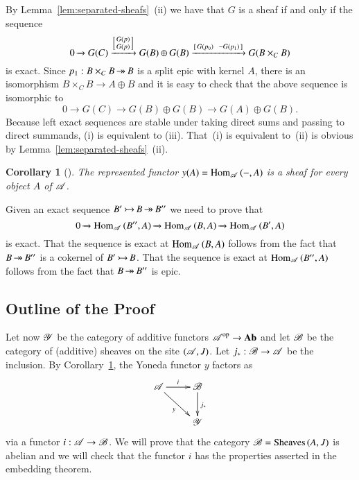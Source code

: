 \documentclass[1p]{elsarticle}
\makeatletter
\renewenvironment{proof}[1][\proofname]{\par
  \pushQED{\qed}%
  \normalfont \topsep6\p@\@plus6\p@\relax
  \trivlist
  \item[\hskip\labelsep
        \scshape
    #1\@addpunct{.}]\ignorespaces
}{%
  \popQED\endtrivlist\@endpefalse
}
\theoremstyle{mythm}
\newtheorem{Cor}[Thm]{Corollary}
\theoremstyle{mydef}
\makeatother
\begin{document}
\begin{proof}
  By Lemma~\ref{lem:separated-sheafs}~(ii) we have that $G$ is a sheaf if
  and only if the sequence
  \[
  0 \xrightarrow{} G(C) \xrightarrow{\left[\begin{smallmatrix} G(p) \\ G(p) \end{smallmatrix}\right]}
  G(B) \oplus G(B) \xrightarrow{\left[\begin{smallmatrix} G(p_{0}) & & -G(p_{1}) \end{smallmatrix}\right]} 
  G(B \times_{C} B)
  \]
  is exact. Since $p_{1}: B \times_{C} B \operatorname{\twoheadrightarrow} B$ is a split epic with
  kernel $A$, there is an isomorphism
  $B \times_{C} B \to A \oplus B$ and it is easy to check that
  the above sequence is isomorphic to 
  \[
  0 \xrightarrow{} G(C) \xrightarrow{} G(B) \oplus G(B) \xrightarrow{}
  G(A) \oplus G(B).
  \]
  Because left exact sequences are stable under taking direct sums
  and passing to direct summands, (i) is equivalent to (iii).
  That~(i) is equivalent to~(ii) is obvious by
  Lemma~\ref{lem:separated-sheafs}~(ii).
\end{proof}


\begin{Cor}[{\cite[A.7.6]{MR1106918}}]
  \label{cor:represented-functor-sheaf}
  The represented functor $y(A) = \operatorname{Hom}_{\operatorname{\mathscr{A}}}{({-},A)}$ is a sheaf
  for every object $A$ of $\operatorname{\mathscr{A}}$.
\end{Cor}
\begin{proof}
  Given an exact sequence $B' \operatorname{\rightarrowtail} B \operatorname{\twoheadrightarrow} B''$ we need to prove that 
  \[
  0 \xrightarrow{} \operatorname{Hom}_{\operatorname{\mathscr{A}}}{(B'', A)} \xrightarrow{}
  \operatorname{Hom}_{\operatorname{\mathscr{A}}}{(B, A)} \xrightarrow{} \operatorname{Hom}_{\operatorname{\mathscr{A}}}{(B', A)}
  \]
  is exact. That the sequence is exact at $\operatorname{Hom}_{\operatorname{\mathscr{A}}}{(B,A)}$
  follows from the fact that $B \operatorname{\twoheadrightarrow} B''$ is a cokernel of
  $B' \operatorname{\rightarrowtail} B$. That the sequence is exact at $\operatorname{Hom}_{\operatorname{\mathscr{A}}}{(B'', A)}$ 
  follows from the fact that $B \operatorname{\twoheadrightarrow} B''$ is epic.
\end{proof}

\subsection{Outline of the Proof}
Let now $\operatorname{\mathscr{Y}}$ be the category of additive functors
$\operatorname{\mathscr{A}}^{\operatorname{op}} \to \operatorname{\mathbf{Ab}}$ and let $\operatorname{\mathscr{B}}$ be the category of (additive)
sheaves on the site $(\operatorname{\mathscr{A}},J)$. Let $j_{\ast}: \operatorname{\mathscr{B}} \to \operatorname{\mathscr{A}}$ be
the inclusion. By
Corollary~\ref{cor:represented-functor-sheaf}, the Yoneda functor $y$
factors as
\[
\xymatrix{
  \scrA \ar[dr]_{y} \ar[r]^{i} & \scrB \ar[d]^{j_{\ast}} \\
  & \scrY
}
\]
via a functor $i : \operatorname{\mathscr{A}} \to \operatorname{\mathscr{B}}$. We will prove that the 
category $\operatorname{\mathscr{B}} = \operatorname{Sheaves}{(A,J)}$ is abelian and
we will check that the functor $i$ has the
properties asserted in the embedding theorem.
\end{document}
